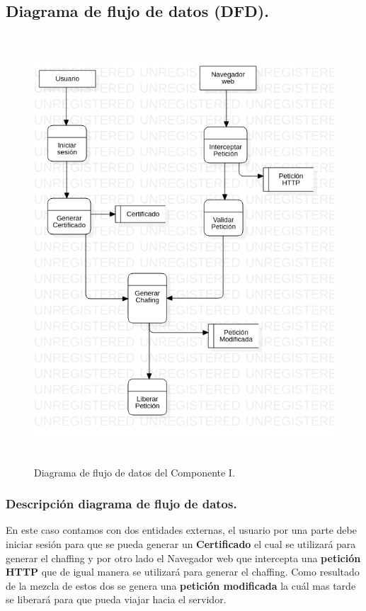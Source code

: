 \documentclass[12pt, a4paper, titlepage]{report}
\begin{document}
			\subsection{Diagrama de flujo de datos (DFD).}
			    \begin{figure}[H]
					\begin{center}			        	    \includegraphics[height=16cm]{./imagenes/Disenio/Componente_1/CI_DFD_P1.png}
						\caption{Diagrama de flujo de datos del Componente I.}
					\end{center}
				\end{figure}
			    
			    \subsubsection{Descripción diagrama de flujo de datos.}
			        En este caso contamos con dos entidades externas, el usuario por una parte debe iniciar sesión para que se pueda generar un \textbf{Certificado} el cual se utilizará para generar el chaffing y por otro lado el Navegador web que intercepta una \textbf{petición HTTP} que de igual manera se utilizará para generar el chaffing. Como resultado de la mezcla de estos dos se genera una \textbf{petición modificada} la cuál mas tarde se liberará para que pueda viajar hacia el servidor.
			   
\end{document}
